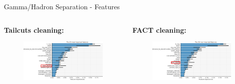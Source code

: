 \begin{frame}{Gamma/Hadron Separation - Features}
    \begin{columns}[T] %
        \begin{column}{.48\textwidth}
            \textbf{Tailcuts cleaning:}
            \vspace{5pt}
            \begin{figure}
                \includegraphics[width=\linewidth]{images/result_plots/tail1/sep_diff_4-crop2.png}
            \end{figure}
        \end{column}
        \begin{column}{.48\textwidth}
            \textbf{FACT cleaning:}
            \vspace{5pt}
            \begin{figure}
                \includegraphics[width=\linewidth]{images/result_plots/fact2/sep_diff_4-crop2.png}
            \end{figure}
        \end{column}
    \end{columns}
\end{frame}

